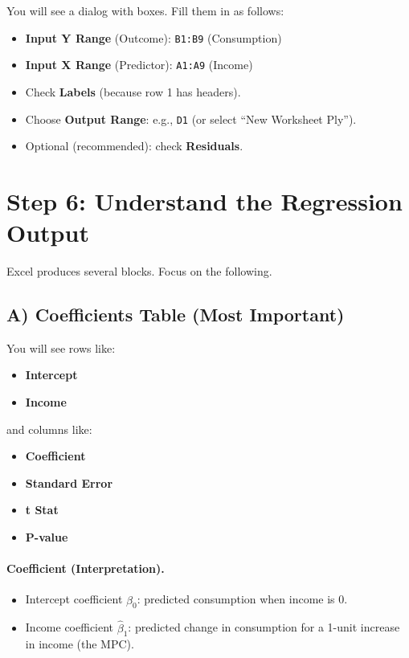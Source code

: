 \documentclass[11pt]{article}
\newcommand{\bhat}{\widehat{\beta}}
\begin{document}
You will see a dialog with boxes. Fill them in as follows:

\begin{tcolorbox}[colback=gray!5, colframe=black!40, title=Regression Dialog Settings]
\begin{itemize}
  \item \textbf{Input Y Range} (Outcome): \texttt{B1:B9} \quad (Consumption)
  \item \textbf{Input X Range} (Predictor): \texttt{A1:A9} \quad (Income)
  \item Check \textbf{Labels} (because row 1 has headers).
  \item Choose \textbf{Output Range}: e.g., \texttt{D1} (or select ``New Worksheet Ply'').
  \item Optional (recommended): check \textbf{Residuals}.
\end{itemize}
\end{tcolorbox}

\section*{Step 6: Understand the Regression Output}
Excel produces several blocks. Focus on the following.

\subsection*{A) Coefficients Table (Most Important)}
You will see rows like:
\begin{itemize}
  \item \textbf{Intercept}
  \item \textbf{Income}
\end{itemize}
and columns like:
\begin{itemize}
  \item \textbf{Coefficient}
  \item \textbf{Standard Error}
  \item \textbf{t Stat}
  \item \textbf{P-value}
\end{itemize}

\paragraph{Coefficient (Interpretation).}
\begin{itemize}
  \item Intercept coefficient $\bhat_0$: predicted consumption when income is 0.
  \item Income coefficient $\bhat_1$: predicted change in consumption for a 1-unit increase in income (the MPC).
\end{itemize}
\end{document}
